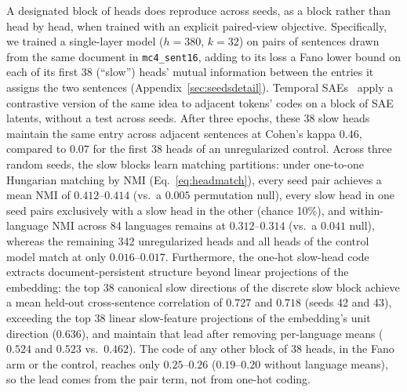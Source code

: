 A designated block of heads does reproduce across seeds, as a block
rather than head by head, when trained with an explicit paired-view
objective. Specifically, we trained a single-layer model ($h{=}380$,
$k{=}32$) on pairs of sentences drawn from the same document in
\texttt{mc4\_sent16}, adding to its loss a Fano lower bound on each of
its first 38 (``slow'') heads' mutual information between the entries it
assigns the two sentences (Appendix~\ref{sec:seedsdetail}). Temporal
SAEs~\cite{bhalla2026temporal} apply a contrastive version of the same
idea to adjacent tokens' codes on a block of SAE latents, without a test
across seeds. After
three epochs, these 38 slow heads maintain the same entry across adjacent
sentences at Cohen's kappa $0.46$, compared to $0.07$ for the first 38 heads
of an unregularized control. Across three random seeds, the slow blocks
learn matching partitions: under one-to-one Hungarian matching by NMI
(Eq.~\eqref{eq:headmatch}), every seed pair achieves a mean NMI of
$0.412$--$0.414$ (vs.\ a $0.005$ permutation null), every slow head in one
seed pairs exclusively with a slow head in the other (chance 10\%), and
within-language NMI across 84 languages remains at $0.312$--$0.314$ (vs.\ a
$0.041$ null), whereas the remaining 342 unregularized heads and all heads
of the control model match at only $0.016$--$0.017$. Furthermore, the
one-hot slow-head code extracts document-persistent structure beyond linear
projections of the embedding: the top 38 canonical slow directions of
the discrete slow block achieve a mean held-out cross-sentence correlation
of $0.727$ and $0.718$ (seeds 42 and 43), exceeding the top 38 linear
slow-feature projections of the embedding's unit direction ($0.636$), and maintain that
lead after removing per-language means ($0.524$ and $0.523$ vs.\ $0.462$).
The code of any other block of 38 heads, in the Fano arm or the control,
reaches only $0.25$--$0.26$ ($0.19$--$0.20$ without language means), so
the lead comes from the pair term, not from one-hot coding.

